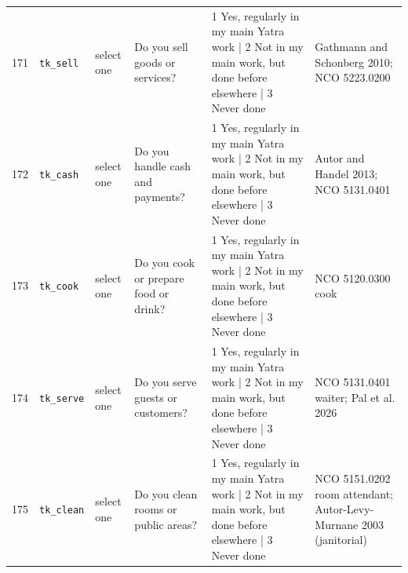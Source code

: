 \documentclass[9pt,a4paper,landscape]{article}
\begin{document}
\begin{longtable}{@{}p{0.5cm}p{3.3cm}p{1.7cm}p{7.3cm}p{5.6cm}p{5.4cm}@{}}
\footnotesize 171 & \footnotesize\texttt{tk\_sell} & \scriptsize select one & \footnotesize Do you sell goods or services? \par\vspace{1pt}{\footnotesize\color{hdr}{\hifont क्या आप सामान या सेवा बेचना का काम करते हैं? (1 अपने मुख्य यात्रा-काम में नियमित; 2 मुख्य काम में नहीं, पर पहले कहीं और किया है; 3 कभी नहीं)}} & \scriptsize 1 Yes, regularly in my main Yatra work | 2 Not in my main work, but done before elsewhere | 3 Never done & \scriptsize Gathmann and Schonberg 2010; NCO 5223.0200\\
\footnotesize 172 & \footnotesize\texttt{tk\_cash} & \scriptsize select one & \footnotesize Do you handle cash and payments? \par\vspace{1pt}{\footnotesize\color{hdr}{\hifont क्या आप पैसे और भुगतान सँभालना का काम करते हैं? (1 अपने मुख्य यात्रा-काम में नियमित; 2 मुख्य काम में नहीं, पर पहले कहीं और किया है; 3 कभी नहीं)}} & \scriptsize 1 Yes, regularly in my main Yatra work | 2 Not in my main work, but done before elsewhere | 3 Never done & \scriptsize Autor and Handel 2013; NCO 5131.0401\\
\footnotesize 173 & \footnotesize\texttt{tk\_cook} & \scriptsize select one & \footnotesize Do you cook or prepare food or drink? \par\vspace{1pt}{\footnotesize\color{hdr}{\hifont क्या आप खाना या पीने की चीज़ बनाना का काम करते हैं? (1 अपने मुख्य यात्रा-काम में नियमित; 2 मुख्य काम में नहीं, पर पहले कहीं और किया है; 3 कभी नहीं)}} & \scriptsize 1 Yes, regularly in my main Yatra work | 2 Not in my main work, but done before elsewhere | 3 Never done & \scriptsize NCO 5120.0300 cook\\
\footnotesize 174 & \footnotesize\texttt{tk\_serve} & \scriptsize select one & \footnotesize Do you serve guests or customers? \par\vspace{1pt}{\footnotesize\color{hdr}{\hifont क्या आप मेहमानों या ग्राहकों की सेवा करना का काम करते हैं? (1 अपने मुख्य यात्रा-काम में नियमित; 2 मुख्य काम में नहीं, पर पहले कहीं और किया है; 3 कभी नहीं)}} & \scriptsize 1 Yes, regularly in my main Yatra work | 2 Not in my main work, but done before elsewhere | 3 Never done & \scriptsize NCO 5131.0401 waiter; Pal et al. 2026\\
\footnotesize 175 & \footnotesize\texttt{tk\_clean} & \scriptsize select one & \footnotesize Do you clean rooms or public areas? \par\vspace{1pt}{\footnotesize\color{hdr}{\hifont क्या आप कमरे या सार्वजनिक जगह साफ़ करना का काम करते हैं? (1 अपने मुख्य यात्रा-काम में नियमित; 2 मुख्य काम में नहीं, पर पहले कहीं और किया है; 3 कभी नहीं)}} & \scriptsize 1 Yes, regularly in my main Yatra work | 2 Not in my main work, but done before elsewhere | 3 Never done & \scriptsize NCO 5151.0202 room attendant; Autor-Levy-Murnane 2003 (janitorial)\\

\end{longtable}
\end{document}
